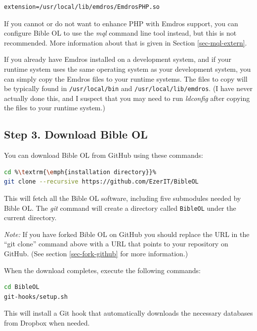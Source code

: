 \documentclass[11pt,oneside,a4paper]{memoir}
\begin{document}
\begin{lstlisting}
extension=/usr/local/lib/emdros/EmdrosPHP.so
\end{lstlisting}

If you cannot or do not want to enhance PHP with Emdros support, you can configure Bible OL to use
the \emph{mql} command line tool instead, but this is not recommended. More information
about that is given in Section \ref{sec-mql-extern}.

If you already have Emdros installed on a development system, and if your runtime system uses the
same operating system as your development system, you can simply copy the Emdros files to your
runtime systems. The files to copy will be typically found in \texttt{/usr/local/bin} and
\texttt{/usr/local/lib/emdros}. (I have never actually done this, and I suspect that you may need to
run \emph{ldconfig} after copying the files to your runtime system.)


\subsection{Step 3. Download Bible OL}\label{sec-download-bol}

You can download Bible OL from GitHub using these commands:

\begin{lstlisting}[language=bash]
cd %\textrm{\emph{installation directory}}%
git clone --recursive https://github.com/EzerIT/BibleOL
\end{lstlisting}

This will fetch all the Bible OL software, including five submodules needed by Bible OL. The
\emph{git} command will create a directory called \texttt{BibleOL} under the current directory.

\emph{Note:} If you have forked Bible OL on GitHub you should replace the URL in the ``git clone''
command above with a URL that points to your repository on GitHub. (See section
\ref{sec-fork-github} for more information.)

When the download completes, execute the following commands:

\begin{lstlisting}[language=bash]
cd BibleOL
git-hooks/setup.sh
\end{lstlisting}

This will install a Git hook that automatically downloads the necessary databases
from Dropbox when needed.
\end{document}
